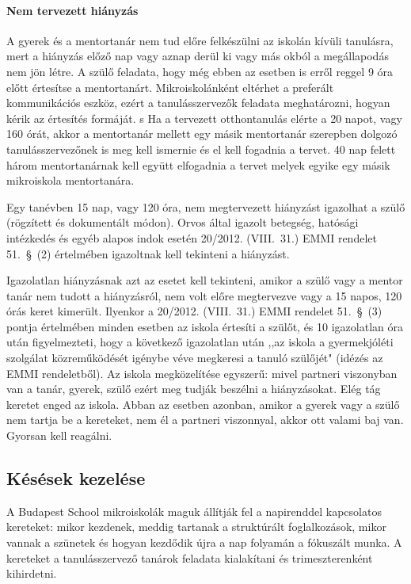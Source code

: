 \paragraph{Nem tervezett hiányzás} A gyerek és a mentortanár nem tud előre felkészülni az iskolán kívüli tanulásra, mert a hiányzás előző nap vagy aznap derül ki vagy más okból a megállapodás nem jön létre. A szülő feladata, hogy még ebben az esetben is erről reggel 9 óra előtt értesítse a mentortanárt. Mikroiskolánként eltérhet a preferált kommunikációs eszköz, ezért a tanulásszervezők feladata meghatározni, hogyan kérik az értesítés formáját.
s
Ha a tervezett otthontanulás elérte a 20 napot, vagy 160 órát, akkor a mentortanár mellett egy másik mentortanár szerepben dolgozó tanulásszervezőnek is meg kell ismernie és el kell fogadnia a tervet. 40 nap felett három mentortanárnak kell együtt elfogadnia a tervet melyek egyike egy másik mikroiskola mentortanára.

Egy tanévben 15 nap, vagy 120 óra, nem megtervezett hiányzást igazolhat a szülő (rögzített és dokumentált módon). Orvos által igazolt betegség, hatósági intézkedés és egyéb alapos indok esetén 20/2012. (VIII.~31.) EMMI rendelet 51.~§~(2) értelmében igazoltnak kell tekinteni a hiányzást.

Igazolatlan hiányzásnak azt az esetet kell tekinteni, amikor a szülő vagy a mentor tanár nem tudott a hiányzásról, nem volt előre megtervezve vagy a 15 napos, 120 órás keret kimerült. Ilyenkor a 20/2012. (VIII.~31.) EMMI rendelet 51.~§~(3) pontja értelmében minden esetben az iskola értesíti a szülőt, és 10 igazolatlan óra után figyelmezteti, hogy a következő igazolatlan után ,,az iskola a gyermekjóléti szolgálat közreműködését igénybe véve megkeresi a tanuló szülőjét" (idézés az EMMI rendeletből). Az iskola megközelítése egyszerű: mivel partneri viszonyban van a tanár, gyerek, szülő ezért meg tudják beszélni a hiányzásokat. Elég tág keretet enged az iskola. Abban az esetben azonban, amikor a gyerek vagy a szülő nem tartja be a kereteket, nem él a partneri viszonnyal, akkor ott valami baj van. Gyorsan kell reagálni.

\subsection{Késések kezelése}
A Budapest School mikroiskolák maguk állítják fel a napirenddel kapcsolatos kereteket: mikor kezdenek, meddig tartanak a struktúrált foglalkozások, mikor vannak a szünetek és hogyan kezdődik újra a nap folyamán a fókuszált munka. A kereteket a tanulásszervező tanárok feladata kialakítani és trimeszterenként kihirdetni.

